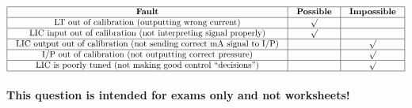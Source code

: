






$$\vbox{\offinterlineskip
\halign{\strut
\vrule \quad\hfil # \ \hfil & 
\vrule \quad\hfil # \ \hfil & 
\vrule \quad\hfil # \ \hfil \vrule \cr
\noalign{\hrule}
%
{\bf Fault} & {\bf Possible} & {\bf Impossible} \cr
%
\noalign{\hrule}
%
LT out of calibration (outputting wrong current) & $\surd$ &  \cr
%
\noalign{\hrule}
%
LIC input out of calibration (not interpreting signal properly) & $\surd$ &  \cr
%
\noalign{\hrule}
%
LIC output out of calibration (not sending correct mA signal to I/P) &  & $\surd$ \cr
%
\noalign{\hrule}
%
I/P out of calibration (not outputting correct pressure) &  & $\surd$ \cr
%
\noalign{\hrule}
%
LIC is poorly tuned (not making good control ``decisions'') &  & $\surd$ \cr
%
\noalign{\hrule}
} %
}$$ %







{\bf This question is intended for exams only and not worksheets!}



